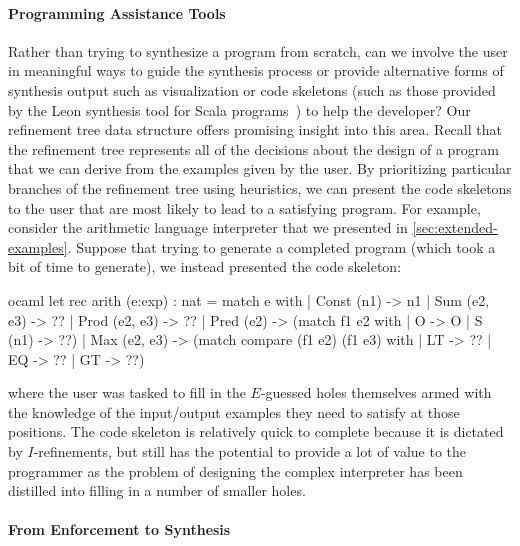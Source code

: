 \paragraph{Programming Assistance Tools}
Rather than trying to synthesize a program from scratch, can we involve the user in meaningful ways to guide the synthesis process or provide alternative forms of synthesis output such as visualization or code skeletons (such as those provided by the Leon synthesis tool for Scala programs~\citep{kneuss-oopsla-2013}) to help the developer?
Our refinement tree data structure offers promising insight into this area.
Recall that the refinement tree represents all of the decisions about the design of a program that we can derive from the examples given by the user.
By prioritizing particular branches of the refinement tree using heuristics, we can present the code skeletons to the user that are most likely to lead to a satisfying program.
For example, consider the arithmetic language interpreter that we presented in \autoref{sec:extended-examples}.
Suppose that trying to generate a completed program (which took a bit of time to generate), we instead presented the code skeleton:
\begin{center}
  \begin{cminted}{ocaml}
let rec arith (e:exp) : nat =
  match e with
  | Const (n1) -> n1
  | Sum (e2, e3) -> ??
  | Prod (e2, e3) -> ??
  | Pred (e2) -> (match f1 e2 with
                 | O -> O
                 | S (n1) -> ??)
  | Max (e2, e3) -> (match compare (f1 e2) (f1 e3) with
                    | LT -> ??
                    | EQ -> ??
                    | GT -> ??)
  \end{cminted}
\end{center}
where the user was tasked to fill in the $E$-guessed holes themselves armed with the knowledge of the input/output examples they need to satisfy at those positions.
The code skeleton is relatively quick to complete because it is dictated by $I$-refinements, but still has the potential to provide a lot of value to the programmer as the problem of designing the complex interpreter has been distilled into filling in a number of smaller holes.

\paragraph{From Enforcement to Synthesis}

